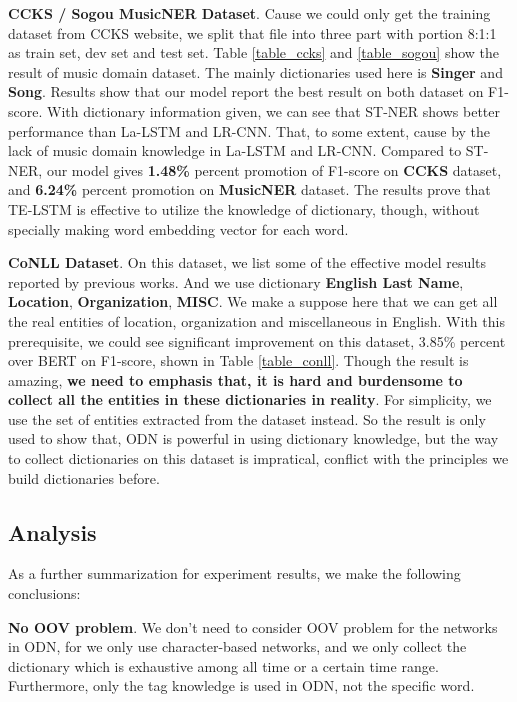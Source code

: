 \documentclass[letterpaper]{article} %
\begin{document}
\textbf{CCKS / Sogou MusicNER Dataset}. Cause we could only get the training dataset from CCKS website, we split that file into three part with portion 8:1:1 as train set, dev set and test set. Table \ref{table_ccks} and \ref{table_sogou} show the result of music domain dataset. The mainly dictionaries used here is \textbf{Singer} and \textbf{Song}. Results show that our model report the best result on both dataset on F1-score. With dictionary information given, we can see that ST-NER shows better performance than La-LSTM and LR-CNN. That, to some extent, cause by the lack of music domain knowledge in La-LSTM and LR-CNN. Compared to ST-NER, our model gives \textbf{1.48\%} percent promotion of F1-score on \textbf{CCKS} dataset, and \textbf{6.24\%} percent promotion on \textbf{MusicNER} dataset. The results prove that TE-LSTM is effective to utilize the knowledge of dictionary, though, without specially making word embedding vector for each word.

\textbf{CoNLL Dataset}. On this dataset, we list some of the effective model results reported by previous works. And we use dictionary \textbf{English Last Name}, \textbf{Location}, \textbf{Organization}, \textbf{MISC}. We make a suppose here that we can get all the real entities of location, organization and miscellaneous in English. With this prerequisite, we could see significant improvement on this dataset, 3.85\% percent over BERT \cite{bert} on F1-score, shown in Table \ref{table_conll}. Though the result is amazing, \textbf{we need to emphasis that, it is hard and burdensome to collect all the entities in these dictionaries in reality}. For simplicity, we use the set of entities extracted from the dataset instead. So the result is only used to show that, ODN is powerful in using dictionary knowledge, but the way to collect dictionaries on this dataset is impratical, conflict with the principles we build dictionaries before.

\subsection{Analysis}



As a further summarization for experiment results, we make the following conclusions:

\textbf{No OOV problem}. We don't need to consider OOV problem for the networks in ODN, for we only use character-based networks, and we only collect the dictionary which is exhaustive among all time or a certain time range. Furthermore, only the tag knowledge is used in ODN, not the specific word.
\end{document}
